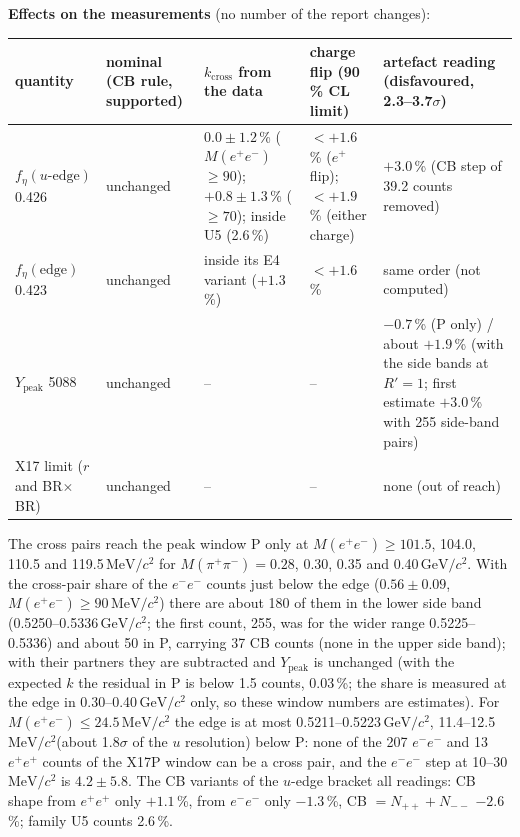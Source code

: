 \documentclass[11pt,a4paper]{article}
\newcommand{\Mee}{\ensuremath{M(e^{+}e^{-})}\xspace}
\newcommand{\Mpipi}{\ensuremath{M(\pi^{+}\pi^{-})}\xspace}
\newcommand{\GeVcc}{\ensuremath{\mathrm{GeV}/c^{2}}\xspace}
\newcommand{\MeVcc}{\ensuremath{\mathrm{MeV}/c^{2}}\xspace}
\newcommand{\Ypeak}{\ensuremath{Y_{\mathrm{peak}}}\xspace}
\begin{document}
\textbf{Effects on the measurements} (no number of the report changes):
\begin{center}\small
\begin{tabularx}{\textwidth}{@{}>{\raggedright\arraybackslash}p{2.6cm} >{\raggedright\arraybackslash}p{2.2cm} L L >{\raggedright\arraybackslash}p{3.4cm}@{}}
\toprule
quantity & nominal (CB rule, supported) & $k_{\mathrm{cross}}$ from the data & charge flip (90\,\% CL limit) & artefact reading (disfavoured, 2.3--3.7$\sigma$) \\
\midrule
$f_\eta(u\text{-edge})$ 0.426 & unchanged & $0.0\pm1.2$\,\% (\Mee$\ge90$); $+0.8\pm1.3$\,\% ($\ge70$); inside U5 (2.6\,\%) & $<+1.6$\,\% ($e^+$ flip); $<+1.9$\,\% (either charge) & $+3.0$\,\% (CB step of 39.2 counts removed) \\
$f_\eta(\mathrm{edge})$ 0.423 & unchanged & inside its E4 variant ($+1.3$\,\%) & $<+1.6$\,\% & same order (not computed) \\
\Ypeak 5088 & unchanged & -- & -- & $-0.7$\,\% (P only) / about $+1.9$\,\% (with the side bands at $R'=1$; first estimate $+3.0$\,\% with 255 side-band pairs) \\
X17 limit ($r$ and BR$\times$BR) & unchanged & -- & -- & none (out of reach) \\
\bottomrule
\end{tabularx}
\end{center}
The cross pairs reach the peak window P only at \Mee$\ge101.5$, 104.0, 110.5 and 119.5\,\MeVcc for \Mpipi $=0.28$, 0.30, 0.35 and 0.40\,\GeVcc.
With the cross-pair share of the $e^-e^-$ counts just below the edge ($0.56\pm0.09$, \Mee$\ge90$\,\MeVcc) there are about 180 of them in the lower
side band (0.5250--0.5336\,\GeVcc; the first count, 255, was for the wider range 0.5225--0.5336) and about 50 in P, carrying 37 CB counts (none in
the upper side band); with their partners they are subtracted and \Ypeak is unchanged (with the expected $k$ the residual in P is below 1.5
counts, 0.03\,\%; the share is measured at the edge in 0.30--0.40\,\GeVcc only, so these window numbers are estimates). For \Mee$\le24.5$\,\MeVcc
the edge is at most 0.5211--0.5223\,\GeVcc, 11.4--12.5\,\MeVcc (about 1.8$\sigma$ of the $u$ resolution) below P: none of the 207 $e^-e^-$ and 13 $e^+e^+$ counts of the X17P window can be a
cross pair, and the $e^-e^-$ step at 10--30\,\MeVcc is $4.2\pm5.8$. The CB variants of the $u$-edge bracket all readings: CB shape from $e^+e^+$
only $+1.1$\,\%, from $e^-e^-$ only $-1.3$\,\%, CB $=N_{++}+N_{--}$ $-2.6$\,\%; family U5 counts 2.6\,\%.
\end{document}
